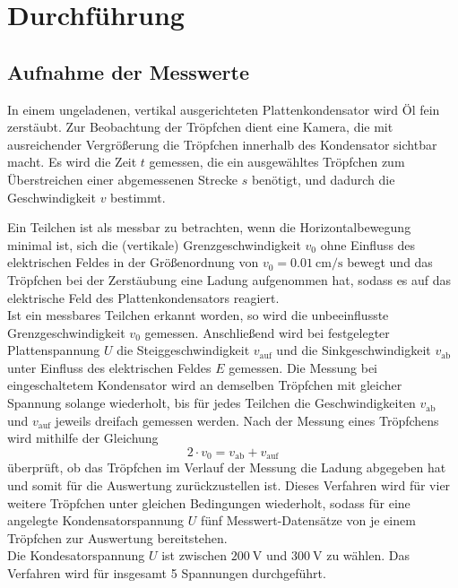 \section{Durchf\"uhrung}
\label{sec:Durchfuehrung}

\subsection{Aufnahme der Messwerte}
In einem ungeladenen, vertikal ausgerichteten Plattenkondensator wird Öl fein zerstäubt.
Zur Beobachtung der Tröpfchen dient eine Kamera, die mit ausreichender Vergrößerung die Tröpfchen innerhalb des Kondensator sichtbar macht.
Es wird die Zeit $t$ gemessen, die ein ausgewähltes Tröpfchen zum Überstreichen einer abgemessenen Strecke $s$ benötigt, und  dadurch die Geschwindigkeit $v$ bestimmt.

Ein Teilchen ist als messbar zu betrachten, wenn die Horizontalbewegung minimal ist, 
sich die (vertikale) Grenzgeschwindigkeit $v_0$ ohne Einfluss des elektrischen Feldes in der Größenordnung von $v_0=\SI{0.01}{\centi\meter\per\second}$ bewegt und 
das Tröpfchen bei der Zerstäubung eine Ladung aufgenommen hat, sodass es auf das elektrische Feld des Plattenkondensators reagiert.\\
Ist ein messbares Teilchen erkannt worden, so wird die unbeeinflusste Grenzgeschwindigkeit $v_0$ gemessen. 
Anschließend wird bei festgelegter Plattenspannung $U$ die Steiggeschwindigkeit $v_\text{auf}$ und die Sinkgeschwindigkeit $v_\text{ab}$ unter Einfluss des elektrischen Feldes $E$ gemessen.
Die Messung bei eingeschaltetem Kondensator wird an demselben Tröpfchen mit gleicher Spannung solange wiederholt, bis für jedes Teilchen die   Geschwindigkeiten $v_\text{ab}$ und $v_\text{auf}$ jeweils dreifach gemessen werden.
Nach der Messung eines Tröpfchens wird mithilfe der Gleichung
\begin{equation}
	2\cdot v_0=v_\text{ab}+v_\text{auf}
	\label{eq:plaus_test}
\end{equation}
überprüft, ob das Tröpfchen im Verlauf der Messung die Ladung abgegeben hat und somit für die Auswertung zurückzustellen ist.
Dieses Verfahren wird für vier weitere Tröpfchen unter gleichen Bedingungen wiederholt, sodass für eine angelegte Kondensatorspannung $U$ fünf Messwert-Datensätze von je einem Tröpfchen zur Auswertung bereitstehen.\\
Die Kondesatorspannung $U$ ist zwischen $\SI{200}{\volt}$ und $\SI{300}{\volt}$ zu wählen.
Das Verfahren wird für insgesamt 5 Spannungen durchgeführt.

